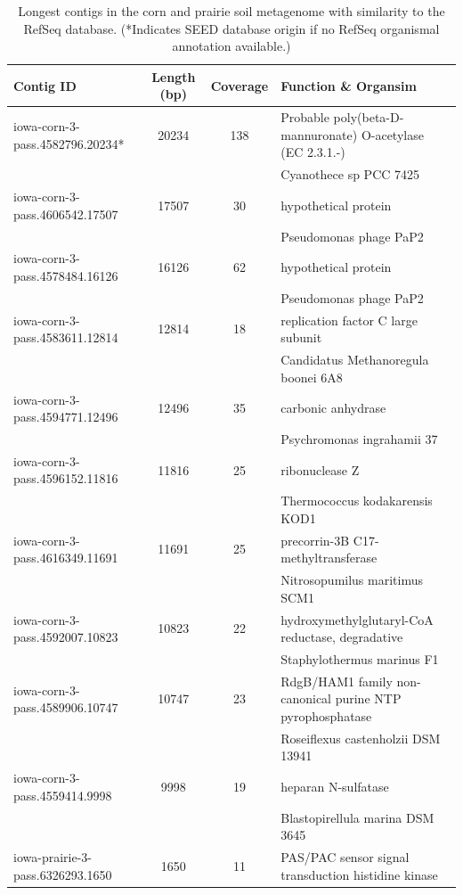 \documentclass{pnastwo}
\begin{document}
\begin{table}
\caption{Longest contigs in the corn and prairie soil metagenome with similarity to the RefSeq database. (*Indicates SEED database origin if no RefSeq organismal annotation available.)}
\begin{tabular}{@{\extracolsep{\fill}}lccl}
Contig ID & Length (bp) & Coverage &  Function \& Organsim \\
 \hline
iowa-corn-3-pass.4582796.20234*	&	20234	&	138	&	Probable poly(beta-D-mannuronate) O-acetylase (EC 2.3.1.-)	\\
	&		&		&	Cyanothece sp PCC 7425	\\
iowa-corn-3-pass.4606542.17507	&	17507	&	30	&	hypothetical protein	\\
	&		&		&	Pseudomonas phage PaP2	\\
iowa-corn-3-pass.4578484.16126	&	16126	&	62	&	hypothetical protein	\\
	&		&		&	Pseudomonas phage PaP2	\\
iowa-corn-3-pass.4583611.12814	&	12814	&	18	&	replication factor C large subunit	\\
	&		&		&	Candidatus Methanoregula boonei 6A8	\\
iowa-corn-3-pass.4594771.12496	&	12496	&	35	&	carbonic anhydrase	\\
	&		&		&	Psychromonas ingrahamii 37	\\
iowa-corn-3-pass.4596152.11816	&	11816	&	25	&	ribonuclease Z	\\
	&		&		&	Thermococcus kodakarensis KOD1	\\
iowa-corn-3-pass.4616349.11691	&	11691	&	25	&	precorrin-3B C17-methyltransferase	\\
	&		&		&	Nitrosopumilus maritimus SCM1	\\
iowa-corn-3-pass.4592007.10823	&	10823	&	22	&	hydroxymethylglutaryl-CoA reductase, degradative	\\
	&		&		&	Staphylothermus marinus F1	\\
iowa-corn-3-pass.4589906.10747	&	10747	&	23	&	RdgB/HAM1 family non-canonical purine NTP pyrophosphatase	\\
	&		&		&	Roseiflexus castenholzii DSM 13941	\\
iowa-corn-3-pass.4559414.9998&	9998	&	19	&	heparan N-sulfatase	\\
	&		&		&	Blastopirellula marina DSM 3645	\\
iowa-prairie-3-pass.6326293.1650	&	1650	&	11	&	PAS/PAC sensor signal transduction histidine kinase	\\

\end{tabular}
\end{table}
\end{document}
